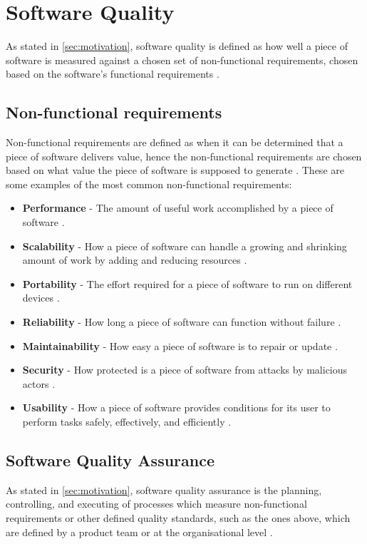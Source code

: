 \section{Software Quality}
As stated in \autoref{sec:motivation}, software quality is defined as how well a piece of software is measured against a chosen set of non-functional requirements, chosen based on the software's functional requirements \cite{iso_25010:2011}. 

\subsection{Non-functional requirements} \label{sec:non_functional_requirments}
Non-functional requirements are defined as when it can be determined that a piece of software delivers value, hence the non-functional requirements are chosen based on what value the piece of software is supposed to generate \cite{iso_25010:2011}. These are some examples of the most common non-functional requirements:

\begin{itemize}
    \item \textbf{Performance} - The amount of useful work accomplished by a piece of software \cite{performance_wiki_2023}.
    \item \textbf{Scalability} - How a piece of software can handle a growing and shrinking amount of work by adding and reducing resources \cite{scalability_wiki_2023}. 
    \item \textbf{Portability} - The effort required for a piece of software to run on different devices \cite{portability_wiki_2023}.
    \item \textbf{Reliability} - How long a piece of software can function without failure \cite{reliability_wiki_2023}.
    \item \textbf{Maintainability} - How easy a piece of software is to repair or update \cite{maintainability_wiki_2023}. 
    \item \textbf{Security} - How protected is a piece of software from attacks by malicious actors \cite{security_wiki_2023}.
    \item \textbf{Usability} - How a piece of software provides conditions for its user to perform tasks safely, effectively, and efficiently \cite{usability_wiki_2023}.
\end{itemize}

\subsection{Software Quality Assurance}
As stated in \autoref{sec:motivation}, software quality assurance is the planning, controlling, and executing of processes which measure non-functional requirements or other defined quality standards, such as the ones above, which are defined by a product team or at the organisational level \cite{ieee_730_2014}\cite{sqa_wiki_2023}.

